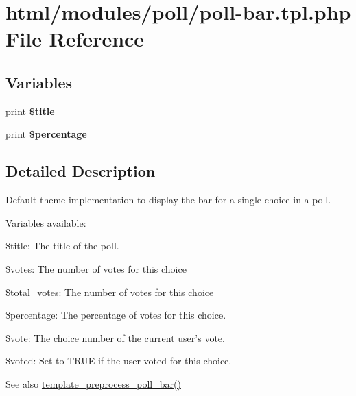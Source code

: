 \hypertarget{poll-bar_8tpl_8php}{
\section{html/modules/poll/poll-\/bar.tpl.php File Reference}
\label{poll-bar_8tpl_8php}
}
\subsection*{Variables}
\begin{DoxyCompactItemize}
\item 
\hypertarget{poll-bar_8tpl_8php_aec2795512d255332f57cacd930a090b4}{
print {\bfseries \$title}}
\label{poll-bar_8tpl_8php_aec2795512d255332f57cacd930a090b4}

\item 
\hypertarget{poll-bar_8tpl_8php_a271a067b3e16b6916b6d2fb7961ccd85}{
print {\bfseries \$percentage}}
\label{poll-bar_8tpl_8php_a271a067b3e16b6916b6d2fb7961ccd85}

\end{DoxyCompactItemize}


\subsection{Detailed Description}
Default theme implementation to display the bar for a single choice in a poll.

Variables available:
\begin{DoxyItemize}
\item \$title: The title of the poll.
\item \$votes: The number of votes for this choice
\item \$total\_\-votes: The number of votes for this choice
\item \$percentage: The percentage of votes for this choice.
\item \$vote: The choice number of the current user's vote.
\item \$voted: Set to TRUE if the user voted for this choice.
\end{DoxyItemize}

\begin{DoxySeeAlso}{See also}
\hyperlink{poll_8module_a65f1b1e0fa803234fe9cde359e79a824}{template\_\-preprocess\_\-poll\_\-bar()} 
\end{DoxySeeAlso}
